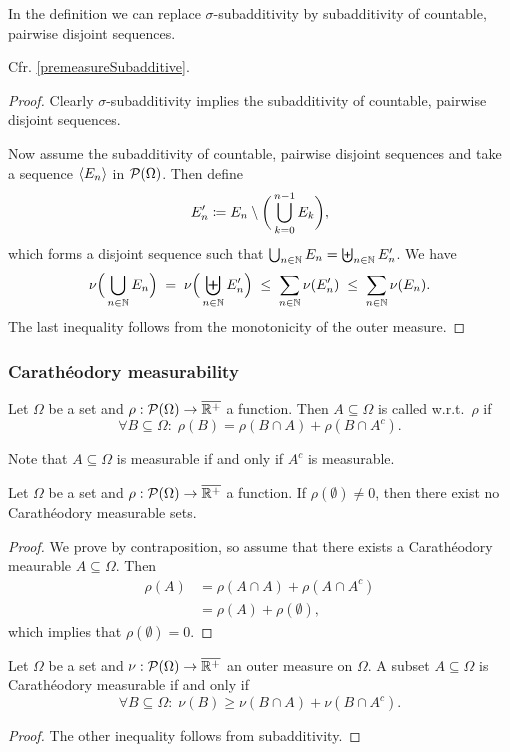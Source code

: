 \begin{lemma}
In the definition we can replace $\sigma$-subadditivity by subadditivity of countable, pairwise disjoint sequences.
\end{lemma}
Cfr. \ref{premeasureSubadditive}.
\begin{proof}
Clearly $\sigma$-subadditivity implies the subadditivity of countable, pairwise disjoint sequences.

Now assume the subadditivity of countable, pairwise disjoint sequences and take a sequence $\left\langle E_n \right\rangle$ in $\operatorname{\mathcal{P}}(\Omega)$. Then define
\[ E_n' \coloneqq E_n \setminus\bigg(\bigcup_{k=0}^{n-1}E_k\bigg), \]
which forms a disjoint sequence such that $\bigcup_{n\in \mathbb{N}}E_n = \biguplus_{n\in \mathbb{N}}E_n'$. We have
\[ \nu\Big(\bigcup_{n\in\mathbb{N}}E_n\Big) \;=\; \nu\Big(\biguplus_{n\in\mathbb{N}}E_n'\Big) \;\leq\; \sum_{n\in\mathbb{N}}\nu(E_n') \;\leq\; \sum_{n\in\mathbb{N}}\nu(E_n). \]
The last inequality follows from the monotonicity of the outer measure.
\end{proof}


\subsubsection{Carathéodory measurability}
\begin{definition}
Let $\Omega$ be a set and $\rho: \operatorname{\mathcal{P}}(\Omega)\to \overline{\mathbb{R}^+}$ a function. Then $A\subseteq \Omega$ is called  w.r.t.\ $\rho$ if
\[ \forall B\subseteq \Omega: \; \rho(B) = \rho(B\cap A) + \rho(B\cap A^c). \]
\end{definition}
Note that $A\subseteq \Omega$ is measurable if and only if $A^c$ is measurable.

\begin{lemma}
Let $\Omega$ be a set and $\rho: \operatorname{\mathcal{P}}(\Omega)\to \overline{\mathbb{R}^+}$ a function. If $\rho(\emptyset) \neq 0$, then there exist no Carathéodory measurable sets.
\end{lemma}
\begin{proof}
We prove by contraposition, so assume that there exists a Carathéodory meaurable $A\subseteq \Omega$.
Then
\begin{align*}
\rho(A) &= \rho(A\cap A) + \rho(A\cap A^c) \\
&= \rho(A) + \rho(\emptyset),
\end{align*}
which implies that $\rho(\emptyset) = 0$.
\end{proof}

\begin{lemma} \label{CaratheodoryMeasurableInequality}
Let $\Omega$ be a set and $\nu: \operatorname{\mathcal{P}}(\Omega)\to \overline{\mathbb{R}^+}$ an outer measure on $\Omega$. A subset $A\subseteq \Omega$ is Carathéodory measurable \textup{if and only if}
\[ \forall B\subseteq \Omega: \; \nu(B) \geq \nu(B\cap A) + \nu(B\cap A^c). \]
\end{lemma}
\begin{proof}
The other inequality follows from subadditivity.
\end{proof}

